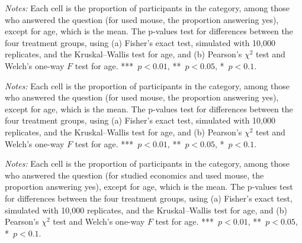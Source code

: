 \documentclass[12pt, letterpaper]{article}
\begin{document}
\begin{table}
\centering
\begin{threeparttable}

\begin{tablenotes}[flushleft]
\footnotesize
\item \textit{Notes:} Each cell is the proportion of participants in the category, among those who answered the question (for used mouse, the proportion answering yes), except for age, which is the mean. The p-values test for differences between the four treatment groups, using (a) Fisher's exact test, simulated with 10,000 replicates, and the Kruskal--Wallis test for age, and (b) Pearson's $\chi^2$ test and Welch's one-way $F$ test for age. ***~$p<0.01$, **~$p<0.05$, *~$p<0.1$.
\end{tablenotes}
\end{threeparttable}
\caption{Covariate balance for microeconomic class sample}\label{tab:covariates-sumstats-micro}
\end{table}

\begin{table}
\centering
\begin{threeparttable}

\begin{tablenotes}[flushleft]
\footnotesize
\item \textit{Notes:} Each cell is the proportion of participants in the category, among those who answered the question (for used mouse, the proportion answering yes), except for age, which is the mean. The p-values test for differences between the four treatment groups, using (a) Fisher's exact test, simulated with 10,000 replicates, and the Kruskal--Wallis test for age, and (b) Pearson's $\chi^2$ test and Welch's one-way $F$ test for age. ***~$p<0.01$, **~$p<0.05$, *~$p<0.1$.
\end{tablenotes}
\end{threeparttable}
\caption{Covariate balance for macroeconomic class sample}\label{tab:covariates-sumstats-macro}
\end{table}

\begin{table}
\centering
\begin{threeparttable}

\begin{tablenotes}[flushleft]
\footnotesize
\item \textit{Notes:} Each cell is the proportion of participants in the category, among those who answered the question (for studied economics and used mouse, the proportion answering yes), except for age, which is the mean. The p-values test for differences between the four treatment groups, using (a) Fisher's exact test, simulated with 10,000 replicates, and the Kruskal--Wallis test for age, and (b) Pearson's $\chi^2$ test and Welch's one-way $F$ test for age. ***~$p<0.01$, **~$p<0.05$, *~$p<0.1$.
\end{tablenotes}
\end{threeparttable}
\caption{Covariate balance for pooled sample}\label{tab:covariates-sumstats-pooled}
\end{table}
\end{document}
